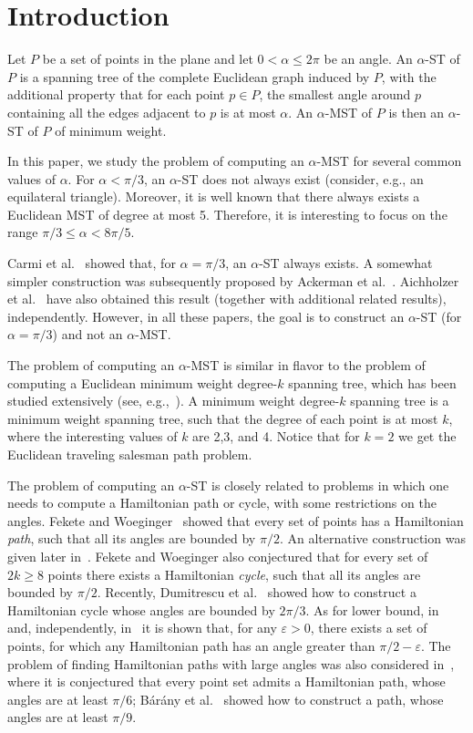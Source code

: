 \documentclass[11pt]{article}
\begin{document}
\section {Introduction}

Let $P$ be a set of points in the plane and let $0 < \alpha \le 2\pi$ be an angle. An $\alpha$-ST of $P$ is a spanning tree of the complete Euclidean graph induced by $P$, with the additional property that for each point $p \in P$, the smallest angle around $p$ containing all the edges adjacent to $p$ is at most $\alpha$. An $\alpha$-MST of $P$ is then an $\alpha$-ST of $P$ of minimum weight.
 
In this paper, we study the problem of computing an $\alpha$-MST for several common values of $\alpha$. For $\alpha < \pi/3$, an $\alpha$-ST does not always exist (consider, e.g., an equilateral triangle). Moreover, it is well known that there always exists a Euclidean MST of degree at most 5.
Therefore, it is interesting to focus on the range $\pi/3 \leq \alpha < 8\pi/5$.

Carmi et al.~\cite{CKLR11} showed that, for $\alpha = \pi/3$, an $\alpha$-ST always exists. A somewhat simpler construction was subsequently proposed by Ackerman et al.~\cite{AGP13}. Aichholzer et al.~\cite{AHHHPSSV13} have also obtained this result (together with additional related results),   independently. However, in all these papers, the goal is to construct an $\alpha$-ST (for $\alpha = \pi/3$) and not an $\alpha$-MST. 

The problem of computing an $\alpha$-MST is similar in flavor to the problem of computing a Euclidean minimum weight degree-$k$ spanning tree, which has been studied extensively (see, e.g.,~\cite{A98, C04, JR09, KRY96, M99}). A minimum weight degree-$k$ spanning tree is a minimum weight spanning tree, such that the degree of each point is at most $k$, where the interesting values of $k$ are 2,3, and 4. Notice that for $k=2$ we get the Euclidean traveling salesman path problem. 

The problem of computing an $\alpha$-ST is closely related to problems in which one needs to compute a Hamiltonian path or cycle, with some restrictions on the angles. Fekete and Woeginger~\cite{FW97} showed that every set of points has a Hamiltonian {\em path}, such that all its angles are bounded by $\pi/2$. An alternative construction was given later in~\cite{CKLR11}. Fekete and Woeginger also conjectured that for every set of $2k \geq 8$ points there exists a Hamiltonian {\em cycle}, such that all its angles are bounded by $\pi/2$. Recently, Dumitrescu et al.~\cite{DPT12} showed how to construct a Hamiltonian cycle whose angles are bounded by $2\pi/3$.
As for lower bound, in~\cite{CKLR11} and, independently, in~\cite{DPT12} it is shown that, for any $\varepsilon>0$, there exists a set of points, for which any Hamiltonian path has an angle greater than $\pi/2 - \varepsilon$.
The problem of finding Hamiltonian paths with large angles was also considered in~\cite{FW97}, where it is conjectured that every point set admits a Hamiltonian path, whose angles are at least $\pi/6$; B{\'a}r{\'a}ny et al.~\cite{BPV09} showed how to construct a path, whose angles are at least $\pi/9$. 
\end{document}
